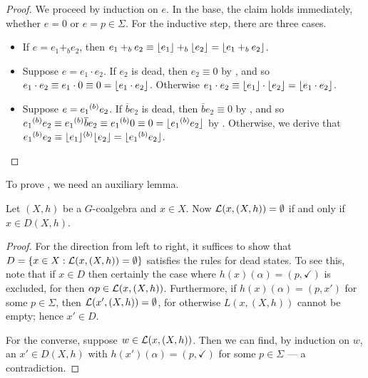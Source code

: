 \documentclass[orivec,envcountsect,envcountsame]{llncs}
\begin{document}
\restateprunepreservesequiv*
\begin{proof}
	We proceed by induction on $e$.
	In the base, the claim holds immediately, whether $e = 0$ or $e = p \in \Sigma$.
	For the inductive step, there are three cases.
	\begin{itemize}
		\item
		If $e = e_1 +_b e_2$, then $e_1 +_b e_2 \equiv \lfloor e_1\rfloor +_b \lfloor e_2\rfloor = \lfloor e_1 +_b e_2\rfloor$.

		\item
		Suppose $e = e_1 \cdot e_2$.
		If $e_2$ is dead, then $e_2 \equiv 0$ by , and so $e_1 \cdot e_2 \equiv e_1 \cdot 0 \equiv 0 = \lfloor e_1 \cdot e_2\rfloor$.
		Otherwise $e_1 \cdot e_2 \equiv \lfloor e_1\rfloor \cdot \lfloor e_2\rfloor = \lfloor e_1 \cdot e_2\rfloor$.

		\item
		Suppose $e = e_1 {\mathbin{^{(b)}}} e_2$.
		If $\overline{b}e_2$ is dead, then $\overline{b}e_2 \equiv 0$ by , and so $e_1 {\mathbin{^{(b)}}} e_2 \equiv e_1 {\mathbin{^{(b)}}} \overline{b}e_2 \equiv e_1 {\mathbin{^{(b)}}} 0 \equiv 0 = \lfloor e_1 {\mathbin{^{(b)}}} e_2\rfloor$ by .
		Otherwise, we derive that $e_1 {\mathbin{^{(b)}}} e_2 \equiv \lfloor e_1\rfloor {\mathbin{^{(b)}}} \lfloor e_2\rfloor = \lfloor e_1 {\mathbin{^{(b)}}} e_2\rfloor$.
	\end{itemize}
\end{proof}

\noindent
To prove , we need an auxiliary lemma.

\begin{lemma}%
	\label{lemma:empty-dead}
	Let $(X, h)$ be a $G$-coalgebra and $x \in X$.
	Now $\mathcal{L}(x, (X, h)) = \emptyset$ if and only if $x \in D(X, h)$.
\end{lemma}
\begin{proof}
	For the direction from left to right, it suffices to show that $D = \{ x \in X : \mathcal{L}(x, (X, h)) = \emptyset \}$ satisfies the rules for dead states.
	To see this, note that if $x \in D$ then certainly the case where $h(x)(\alpha) = (p, \checkmark)$ is excluded, for then $\alpha{}p \in \mathcal{L}(x, (X, h))$.
	Furthermore, if $h(x)(\alpha) = (p, x')$ for some $p \in \Sigma$, then $\mathcal{L}(x', (X, h)) = \emptyset$, for otherwise $L(x, (X, h))$ cannot be empty; hence $x' \in D$.

	For the converse, suppose $w \in \mathcal{L}(x, (X, h))$.
	Then we can find, by induction on $w$, an $x' \in D(X, h)$ with $h(x')(\alpha) = (p, \checkmark)$ for some $p \in \Sigma$ --- a contradiction.
\end{proof}
\end{document}
